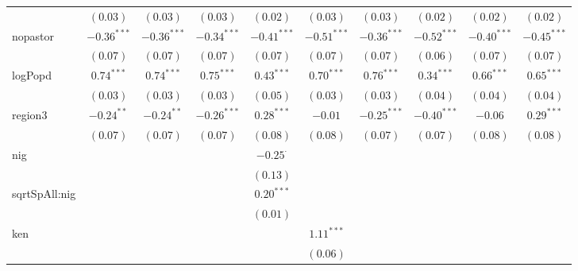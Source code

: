 \begin{sidewaystable}
\begin{center}
{\begin{tabular}{l c c c c c c c c c}
                  & $(0.03)$      & $(0.03)$      & $(0.03)$      & $(0.02)$        & $(0.03)$       & $(0.03)$      & $(0.02)$        & $(0.02)$      & $(0.02)$      \\
nopastor          & $-0.36^{***}$ & $-0.36^{***}$ & $-0.34^{***}$ & $-0.41^{***}$   & $-0.51^{***}$  & $-0.36^{***}$ & $-0.52^{***}$   & $-0.40^{***}$ & $-0.45^{***}$ \\
                  & $(0.07)$      & $(0.07)$      & $(0.07)$      & $(0.07)$        & $(0.07)$       & $(0.07)$      & $(0.06)$        & $(0.07)$      & $(0.07)$      \\
logPopd           & $0.74^{***}$  & $0.74^{***}$  & $0.75^{***}$  & $0.43^{***}$    & $0.70^{***}$   & $0.76^{***}$  & $0.34^{***}$    & $0.66^{***}$  & $0.65^{***}$  \\
                  & $(0.03)$      & $(0.03)$      & $(0.03)$      & $(0.05)$        & $(0.03)$       & $(0.03)$      & $(0.04)$        & $(0.04)$      & $(0.04)$      \\
region3           & $-0.24^{**}$  & $-0.24^{**}$  & $-0.26^{***}$ & $0.28^{***}$    & $-0.01$        & $-0.25^{***}$ & $-0.40^{***}$   & $-0.06$       & $0.29^{***}$  \\
                  & $(0.07)$      & $(0.07)$      & $(0.07)$      & $(0.08)$        & $(0.08)$       & $(0.07)$      & $(0.07)$        & $(0.08)$      & $(0.08)$      \\
nig               &               &               &               & $-0.25^{\cdot}$ &                &               &                 &               &               \\
                  &               &               &               & $(0.13)$        &                &               &                 &               &               \\
sqrtSpAll:nig     &               &               &               & $0.20^{***}$    &                &               &                 &               &               \\
                  &               &               &               & $(0.01)$        &                &               &                 &               &               \\
ken               &               &               &               &                 & $1.11^{***}$   &               &                 &               &               \\
                  &               &               &               &                 & $(0.06)$       &               &                 &               &               \\

\end{tabular}}
\end{center}
\end{sidewaystable}
